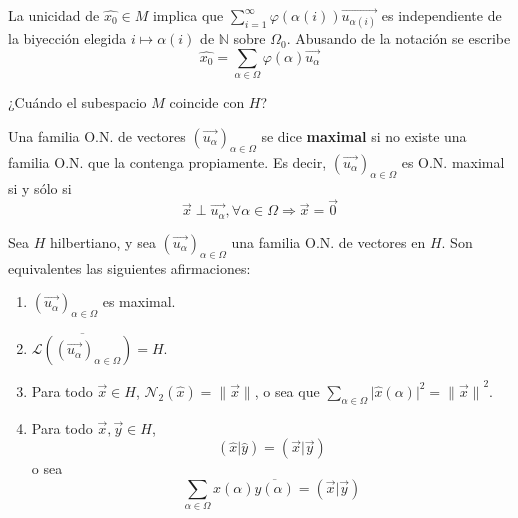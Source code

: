 \documentclass[12pt]{report}
\newcounter{it}
\theoremstyle{largebreak}
\newcommand\abs[1]{\ensuremath{\big|#1\big|}}
\newcommand\norm[1]{\ensuremath{\|#1\|}}
\newcommand\pint[2]{\ensuremath{\left(#1\big| #2\right)}}
\newcommand\conj[1]{\ensuremath{\overline{#1}}}
\newcommand{\N}[2]{\ensuremath{\mathcal{N}_{#1}\left(#2\right)}}
\begin{document}
    \begin{obs}
        La unicidad de $\hat{x_0}\in M$ implica que $\sum_{i=1}^{\infty}\varphi(\alpha(i))\vec{u_{\alpha(i)}}$ es independiente de la biyección elegida $i\mapsto \alpha(i)$ de $\mathbb{N}$ sobre $\Omega_0$. Abusando de la notación se escribe
        \begin{equation*}
            \hat{x_0}=\sum_{\alpha\in\Omega}\varphi(\alpha)\vec{u_\alpha}
        \end{equation*}
    \end{obs}

    ¿Cuándo el subespacio $M$ coincide con $H$?

    \begin{mydef}
        Una familia O.N. de vectores $\left(\vec{u_\alpha} \right)_{\alpha\in\Omega}$ se dice \textbf{maximal} si no existe una familia O.N. que la contenga propiamente. Es decir, $\left(\vec{u_\alpha} \right)_{\alpha\in\Omega}$ es O.N. maximal si y sólo si
        \begin{equation*}
            \vec{x}\perp\vec{u_\alpha},\forall\alpha\in\Omega\Rightarrow\vec{x}=\vec{0}
        \end{equation*}
    \end{mydef}

    \begin{theor}
        Sea $H$ hilbertiano, y sea $\left(\vec{u_\alpha} \right)_{\alpha\in\Omega}$ una familia O.N. de vectores en $H$. Son equivalentes las siguientes afirmaciones:
        \begin{enumerate}
            \item $\left(\vec{u_\alpha} \right)_{\alpha\in\Omega}$ es maximal.
            \item $\overline{\mathcal{L}\left(\left(\vec{u_\alpha} \right)_{\alpha\in\Omega}\right)}=H$.
            \item Para todo $\vec{x}\in H$, $\N{2}{\hat{x}}=\norm{\vec{x}}$, o sea que $\sum_{\alpha\in\Omega}\abs{\hat{x}(\alpha)}^2=\norm{\vec{x}}^2$.
            \item Para todo $\vec{x},\vec{y}\in H$,
            \begin{equation*}
                \pint{\hat{x}}{\hat{y}}=\pint{\vec{x}}{\vec{y}}
            \end{equation*}
            o sea
            \begin{equation*}
                \sum_{\alpha\in\Omega}x(\alpha)\conj{y(\alpha)}=\pint{\vec{x}}{\vec{y}}
            \end{equation*}
        \end{enumerate}

    \end{theor}
\end{document}
